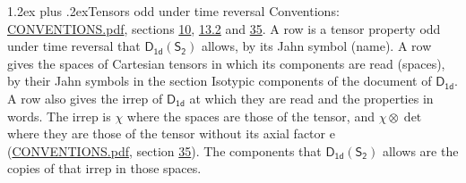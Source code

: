 \documentclass[10pt,a4paper]{article}
\makeatletter
\renewcommand\section{\@startsection{section}{1}{\z@}{-3ex plus -1ex minus -.2ex}%
  {1.2ex plus .2ex}{\normalfont\large\sffamily\bfseries\color{parttitle}}}
\numberwithin{equation}{section}
\newcommand{\grp}[1]{\mathsf{#1}}
\newcommand{\irrprod}{\otimes}
\makeatother
\begin{document}
\section{Tensors odd under time reversal}\label{s:time_odd}
Conventions: \href{../../CONVENTIONS.pdf}{CONVENTIONS.pdf}, sections \href{../../../rotation/CONVENTIONS.pdf\#conv.10}{10}, \href{../../../rotation/CONVENTIONS.pdf\#conv.13.2}{13.2} and \href{../../CONVENTIONS.pdf\#conv.35}{35}.
\leavevmode\label{n:head.name.property}A row is a tensor property odd under time reversal that $\grp{D_{1d}}(\grp{S_{2}})$ allows, by its Jahn symbol (name). \label{n:head.spaces}A row gives the spaces of Cartesian tensors in which its components are read (spaces), by their Jahn symbols in the section Isotypic components of the document of \href{../../../rotation/data/pdf/D1d.pdf}{$\grp{D_{1d}}$}. \label{n:head.properties}A row also gives the irrep of $\grp{D_{1d}}$ at which they are read and the properties in words. The irrep is $\chi$ where the spaces are those of the tensor, and $\chi \irrprod \det$ where they are those of the tensor without its axial factor e (\href{../../CONVENTIONS.pdf}{CONVENTIONS.pdf}, section \href{../../CONVENTIONS.pdf\#conv.35}{35}). The components that $\grp{D_{1d}}(\grp{S_{2}})$ allows are the copies of that irrep in those spaces.
\end{document}

